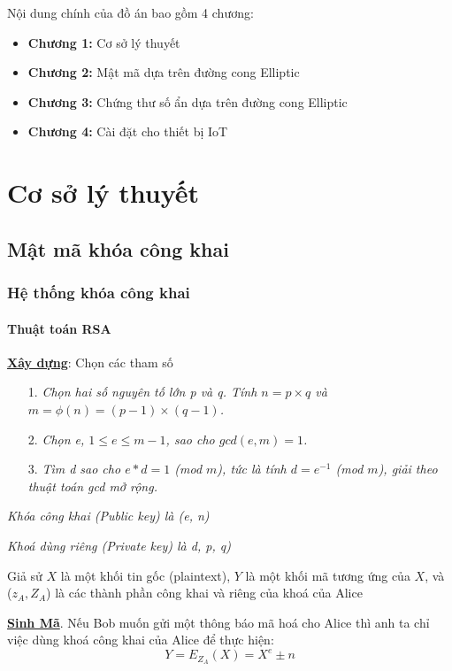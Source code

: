 \documentclass[a4paper,12pt]{report}
\begin{document}
Nội dung chính của đồ án bao gồm 4 chương:
\begin{itemize}
\item \textbf{Chương 1:} Cơ sở lý thuyết
\item \textbf{Chương 2:} Mật mã dựa trên đường cong Elliptic
\item \textbf{Chương 3:} Chứng thư số ẩn dựa trên đường cong Elliptic
\item \textbf{Chương 4:} Cài đặt cho thiết bị IoT
\end{itemize}
\chapter{Cơ sở lý thuyết}
\section{Mật mã khóa công khai}
\subsection*{Hệ thống khóa công khai}
\subsubsection{Thuật toán RSA}
\textbf{\underline{Xây dựng}}: Chọn các tham số
\begin{itemize}
\item[1. ] \textit{Chọn hai số nguyên tố lớn p và q. Tính $n = p \times q$ và $m = \phi(n) = (p - 1) \times (q - 1)$.}
\item[2. ] \textit{Chọn e, $1 \leq e \leq m -1$, sao cho $gcd(e, m) = 1$.}
\item[3. ] \textit{Tìm d sao cho $e * d = 1$ (mod $m$), tức là tính $d = e^{-1}$
(mod $m$), giải theo thuật toán gcd mở rộng.}
\end{itemize}

\textit{Khóa công khai (Public key) là (e, n)}

\textit{Khoá dùng riêng (Private key) là d, p, q)}

Giả sử $X$ là một khối tin gốc (plaintext), $Y$ là một khối mã tương ứng của $X$, và ($z_A, Z_A$) là các thành phần công khai và riêng của khoá của Alice

\textbf{\underline{Sinh Mã}}. Nếu Bob muốn gửi một thông báo mã hoá cho Alice thì anh ta chỉ việc dùng khoá công khai của Alice để thực hiện:
\begin{displaymath}
Y = E_{Z_A}(X) = X^e \pm n
\end{displaymath}
\end{document}
